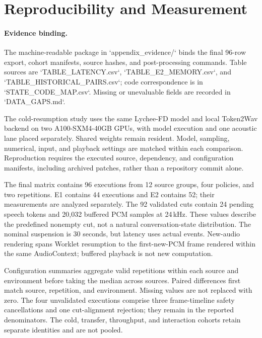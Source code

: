 
\clearpage
\appendix

\section{Reproducibility and Measurement}
\label{app:protocol}

\paragraph{Evidence binding.} The machine-readable package in `appendix\_evidence/` binds the final 96-row export, cohort manifests, source hashes, and post-processing commands. Table sources are `TABLE\_LATENCY.csv`, `TABLE\_E2\_MEMORY.csv`, and `TABLE\_HISTORICAL\_PAIRS.csv`; code correspondence is in `STATE\_CODE\_MAP.csv`. Missing or unevaluable fields are recorded in `DATA\_GAPS.md`.


The cold-resumption study uses the same Lychee-FD model and local
Token2Wav backend \citep{lychee2026} on two A100-SXM4-40GB GPUs,
with model execution and one acoustic lane placed separately.
Shared weights remain resident.
Model, sampling, numerical, input, and playback settings are matched
within each comparison. Reproduction requires the executed source,
dependency, and configuration manifests, including archived patches,
rather than a repository commit alone.

The final matrix contains 96 executions from 12 source groups,
four policies, and two repetitions. E1 contains 44 executions and
E2 contains 52; their measurements are analyzed separately.
The 92 validated cuts contain 24 pending speech tokens and
20,032 buffered PCM samples at 24\,kHz.
These values describe the predefined nonempty cut, not a natural
conversation-state distribution.
The nominal suspension is 30 seconds, but latency uses actual events.
New-audio rendering spans Worklet resumption to the first-new-PCM frame
rendered within the same AudioContext;
buffered playback is not new computation.

Configuration summaries aggregate valid repetitions within each
source and environment before taking the median across sources.
Paired differences first match source, repetition, and environment.
Missing values are not replaced with zero.
The four unvalidated executions comprise three frame-timeline safety
cancellations and one cut-alignment rejection; they remain in the
reported denominators.
The cold, transfer, throughput, and interaction cohorts retain
separate identities and are not pooled.


